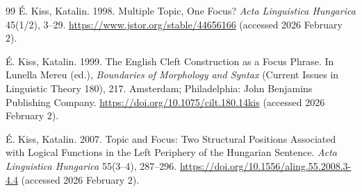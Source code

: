 \documentclass[a4paper, ruler]{CUP-JNL-LIN}%
\begin{document}
\begin{Backmatter}
\begin{thebibliography}{99}
{É. Kiss, Katalin}. 1998. Multiple Topic, One Focus? \textit{Acta Linguistica Hungarica} 45(1/2), 3--29. \url{https://www.jstor.org/stable/44656166} (accessed 2026 February 2).




{É. Kiss, Katalin}. 1999. The English Cleft Construction as a Focus Phrase. In Lunella Mereu (ed.), \textit{Boundaries of Morphology and Syntax} (Current Issues in Linguistic Theory 180), 217. Amsterdam; Philadelphia: John Benjamins Publishing Company. \url{https://doi.org/10.1075/cilt.180.14kis} (accessed 2026 February 2).




{É. Kiss, Katalin}. 2007. Topic and Focus: Two Structural Positions Associated with Logical Functions in the Left Periphery of the Hungarian Sentence. \textit{Acta Linguistica Hungarica} 55(3--4), 287--296. \url{https://doi.org/10.1556/aling.55.2008.3-4.4} (accessed 2026 February 2).




\end{thebibliography}
\end{Backmatter}
\end{document}
